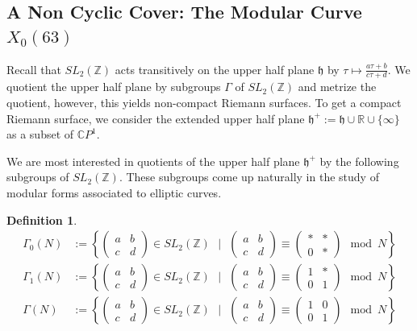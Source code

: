 \documentclass[12pt,reqno]{amsart}
\newcommand{\C}{\mathbb{C}}
\newcommand{\Z}{\mathbb{Z}}
\newcommand{\R}{\mathbb{R}}
\theoremstyle{definition}
\newtheorem{defn}{Definition}
\theoremstyle{remark}
\begin{document}
\subsection{A Non Cyclic Cover: The Modular Curve $X_0(63)$}


\label{sec:modular}
Recall that $SL_2(\Z)$ acts transitively on the upper half plane $\mathfrak{h}$ by $\tau \mapsto \frac{a\tau + b}{c\tau + d}$. We quotient the upper half plane by subgroups $\Gamma$ of $SL_2(\Z)$ and metrize the quotient, however, this yields non-compact Riemann surfaces. To get a compact Riemann surface, we consider the extended upper half plane $\mathfrak{h}^{+} := \mathfrak{h} \cup \R \cup \{ \infty \}$ as a subset of $\C P^1$.  

We are most interested in quotients of the upper half plane $\mathfrak{h}^{+}$ by the following subgroups of $SL_2(\Z)$. These subgroups come up naturally in the study of modular forms associated to elliptic curves.

\begin{defn} 
\begin{align*} 
\Gamma_0(N) &:= \left\{ \begin{pmatrix} a & b \\ c & d \end{pmatrix} \in SL_2(\Z) \text{ }  \Big| \text{ } \begin{pmatrix} a & b \\ c & d \end{pmatrix} \equiv  \begin{pmatrix} * & * \\ 0 & * \end{pmatrix} \mod N \right\} \\
\Gamma_1(N) &:= \left\{ \begin{pmatrix} a & b \\ c & d \end{pmatrix} \in SL_2(\Z) \text{ }  \Big| \text{ }  \begin{pmatrix} a & b \\ c & d \end{pmatrix} \equiv  \begin{pmatrix} 1 & * \\ 0 & 1 \end{pmatrix} \mod N \right\} \\
\Gamma(N) &:= \left\{ \begin{pmatrix} a & b \\ c & d \end{pmatrix} \in SL_2(\Z) \text{ }  \Big| \text{ }  \begin{pmatrix} a & b \\ c & d \end{pmatrix} \equiv  \begin{pmatrix} 1 & 0 \\ 0 & 1 \end{pmatrix} \mod N \right\}
\end{align*}
 \end{defn} 
\end{document}
